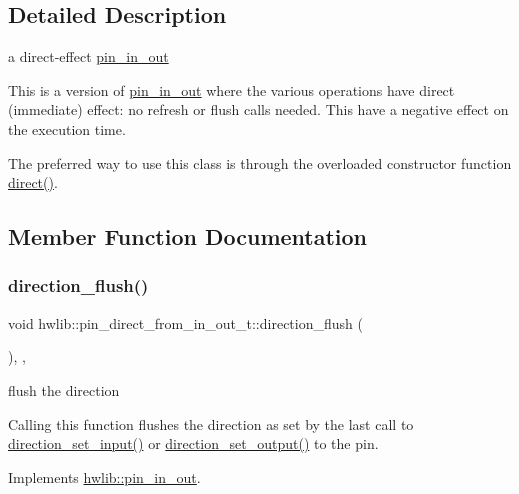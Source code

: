 \subsection{Detailed Description}
a direct-\/effect \hyperlink{classhwlib_1_1pin__in__out}{pin\+\_\+in\+\_\+out}

This is a version of \hyperlink{classhwlib_1_1pin__in__out}{pin\+\_\+in\+\_\+out} where the various operations have direct (immediate) effect\+: no refresh or flush calls needed. This have a negative effect on the execution time.

The preferred way to use this class is through the overloaded constructor function \hyperlink{namespacehwlib_a43941b7f246ad934ee43dbfa0f5c8b5a}{direct()}. 

\subsection{Member Function Documentation}
\mbox{\label{classhwlib_1_1pin__direct__from__in__out__t_ae9704d45e0a75261d126ca0409cda8c2}} 
\subsubsection{\texorpdfstring{direction\+\_\+flush()}{direction\_flush()}}
{\footnotesize\ttfamily void hwlib\+::pin\+\_\+direct\+\_\+from\+\_\+in\+\_\+out\+\_\+t\+::direction\+\_\+flush (\begin{DoxyParamCaption}{ }\end{DoxyParamCaption})\hspace{0.3cm}{\ttfamily [inline]}, {\ttfamily [override]}, {\ttfamily [virtual]}}

flush the direction

Calling this function flushes the direction as set by the last call to \hyperlink{classhwlib_1_1pin__direct__from__in__out__t_a7326f2559461b3efd0fbf1af4fd7fdff}{direction\+\_\+set\+\_\+input()} or \hyperlink{classhwlib_1_1pin__direct__from__in__out__t_a1bd7746b4b114c1ea73d214006fc79bc}{direction\+\_\+set\+\_\+output()} to the pin. 

Implements \hyperlink{classhwlib_1_1pin__in__out_a86ef2b296683d8c0133280075c82cb51}{hwlib\+::pin\+\_\+in\+\_\+out}.

